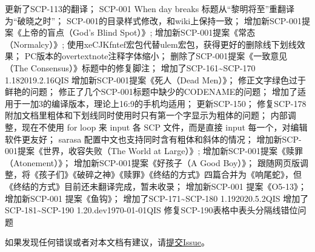\begin{versionhistory}
{    更新了SCP-113的翻译；
    SCP-001 When day breaks 标题从“黎明将至”重翻译为“破晓之时”；
    SCP-001的目录样式修改，和wiki上保持一致；
    增加新SCP-001提案《上帝的盲点（God's Blind Spot）》;
    增加新SCP-001提案《常态（Normalcy）》;
    使用xeCJKfntef宏包代替ulem宏包，获得更好的删除线下划线效果；
    PC版本的overtextnote注释字体缩小；
    删除了SCP-001提案《一致意见（The Consensus）》标题中的修复脚注；
    增加了SCP-161\textasciitilde SCP-170
}
\vhEntry
{1.18}{2019.2.16}{QIS}{
    增加新SCP-001提案《死人（Dead Men）》；
    修正文字绿色过于鲜艳的问题；
    修正了几个SCP-001标题中缺少的CODENAME的问题；
    增加了适用于一加3的编译版本，理论上16:9的手机均适用；
    更新SCP-150；
    修复SCP-178附加文档里粗体和下划线同时使用时只有第一个字显示为粗体的问题；
    内部调整，现在不使用 for loop 来 input 各 SCP 文件，而是直接 input 每一个，对编辑软件更友好；
    sarasa 配置中文也支持同时含有粗体和斜体的情况；
    增加新SCP-001提案《世界，收容失败（The World at Large）》;
    增加新SCP-001提案《赎罪（Atonement）》；
    增加新SCP-001提案《好孩子（A Good Boy）》；
    跟随网页版调整，将《孩子们》《破碎之神》《赎罪》《终结的方式》四篇合并为《响尾蛇》，但《终结的方式》目前还未翻译完成，暂未收录；
    增加新SCP-001 提案《O5-13》；
    增加新SCP-001 提案《鱼钩》；
    增加了SCP-171\textasciitilde SCP-180
}
\vhEntry
{1.19}{2020.5.2}{QIS}{
    增加了SCP-181\textasciitilde SCP-190
}
\vhEntry
{1.20.dev}{\today}{QIS}{
    修复SCP-190表格中表头分隔线错位问题
}
\end{versionhistory}

如果发现任何错误或者对本文档有建议，请\href{https://github.com/7sDream/scp-pdf/issues}{提交Issue}。
